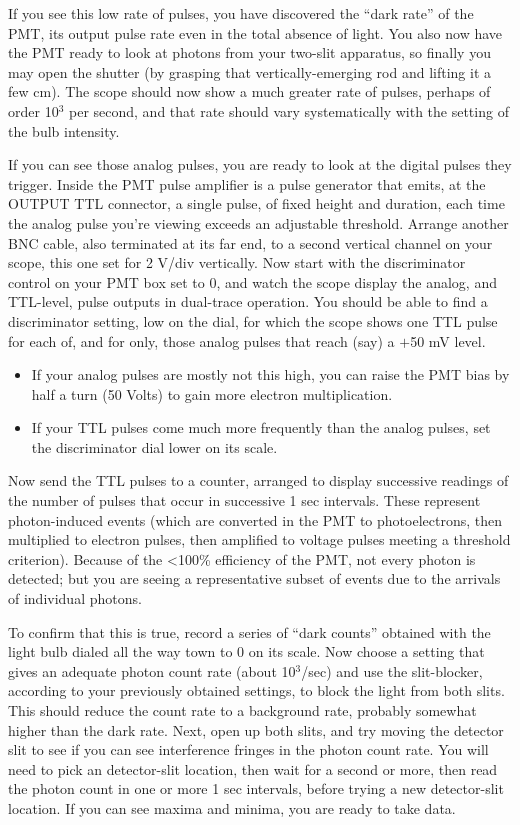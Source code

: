 \documentclass[11pt]{article}
\begin{document}
If you see this low rate of pulses, you have discovered the ``dark rate'' of the
PMT, its output pulse rate even in the total absence of light. You also now have
the PMT ready to look at photons from your two-slit apparatus, so finally you
may open the shutter (by grasping that vertically-emerging rod and lifting it a
few cm). The scope should now show a much greater rate of pulses, perhaps of
order 10$^3$ per second, and that rate should vary systematically with the setting
of the bulb intensity.

If you can see those analog pulses, you are ready to look at the digital pulses
they trigger. Inside the PMT pulse amplifier is a pulse generator that emits, at
the OUTPUT TTL connector, a single pulse, of fixed height and duration, each
time the analog pulse you’re viewing exceeds an adjustable threshold. Arrange
another BNC cable, also terminated at its far end, to a second vertical channel
on your scope, this one set for 2 V/div vertically. Now start with the
discriminator control on your PMT box set to 0, and watch the scope display the
analog, and TTL-level, pulse outputs in dual-trace operation. You should be able
to find a discriminator setting, low on the dial, for which the scope shows one
TTL pulse for each of, and for only, those analog pulses that reach (say) a $+$50
mV level.

\begin{itemize}
\item If your analog pulses are mostly not this high, you can raise the PMT bias
by half a turn (50 Volts) to gain more electron multiplication.

\item If your TTL pulses come much more frequently than the analog pulses, set
the discriminator dial lower on its scale.
\end{itemize}

Now send the TTL pulses to a counter, arranged to display successive readings of
the number of pulses that occur in successive 1 sec intervals. These represent
photon-induced events (which are converted in the PMT to photoelectrons, then
multiplied to electron pulses, then amplified to voltage pulses meeting a
threshold criterion). Because of the <100\% efficiency of the PMT, not every
photon is detected; but you are seeing a representative subset of events due to
the arrivals of individual photons.

To confirm that this is true, record a series of ``dark counts'' obtained with
the light bulb dialed all the way town to 0 on its scale. Now choose a setting
that gives an adequate photon count rate (about 10$^3$/sec) and use the
slit-blocker, according to your previously obtained settings, to block the light
from both slits. This should reduce the count rate to a background rate,
probably somewhat higher than the dark rate. Next, open up both slits, and try
moving the detector slit to see if you can see interference fringes in the
photon count rate. You will need to pick an detector-slit location, then wait
for a second or more, then read the photon count in one or more 1 sec intervals,
before trying a new detector-slit location. If you can see maxima and minima,
you are ready to take data.
\end{document}
